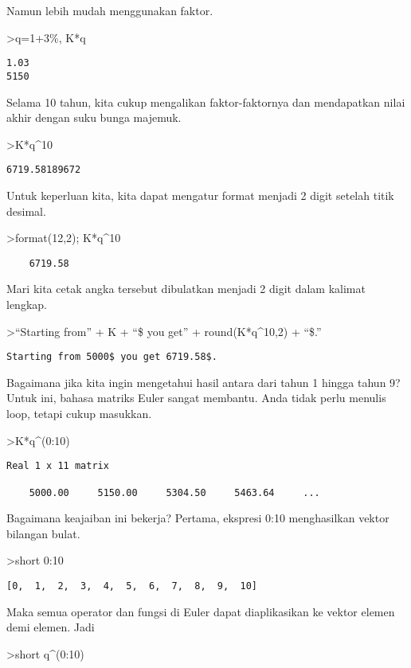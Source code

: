 \documentclass[
]{book}
\begin{document}
Namun lebih mudah menggunakan faktor.

\textgreater q=1+3\%, K*q

\begin{verbatim}
1.03
5150
\end{verbatim}

Selama 10 tahun, kita cukup mengalikan faktor-faktornya dan mendapatkan nilai akhir dengan suku bunga majemuk.

\textgreater K*q\^{}10

\begin{verbatim}
6719.58189672
\end{verbatim}

Untuk keperluan kita, kita dapat mengatur format menjadi 2 digit setelah titik desimal.

\textgreater format(12,2); K*q\^{}10

\begin{verbatim}
    6719.58 
\end{verbatim}

Mari kita cetak angka tersebut dibulatkan menjadi 2 digit dalam kalimat lengkap.

\textgreater{}``Starting from'' + K + ``\$ you get'' + round(K*q\^{}10,2) + ``\$.''

\begin{verbatim}
Starting from 5000$ you get 6719.58$.
\end{verbatim}

Bagaimana jika kita ingin mengetahui hasil antara dari tahun 1 hingga tahun 9? Untuk ini, bahasa matriks Euler sangat membantu. Anda tidak perlu menulis loop, tetapi cukup masukkan.

\textgreater K*q\^{}(0:10)

\begin{verbatim}
Real 1 x 11 matrix

    5000.00     5150.00     5304.50     5463.64     ...
\end{verbatim}

Bagaimana keajaiban ini bekerja? Pertama, ekspresi 0:10 menghasilkan vektor bilangan bulat.

\textgreater short 0:10

\begin{verbatim}
[0,  1,  2,  3,  4,  5,  6,  7,  8,  9,  10]
\end{verbatim}

Maka semua operator dan fungsi di Euler dapat diaplikasikan ke vektor elemen demi elemen. Jadi

\textgreater short q\^{}(0:10)
\end{document}
